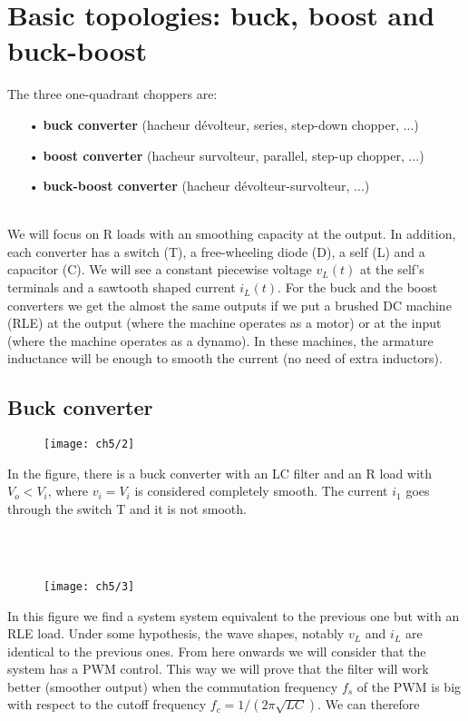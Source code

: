 \section{Basic topologies: buck, boost and buck-boost}
	The three one-quadrant choppers are:
	\begin{itemize}
		\item[•] \textbf{buck converter} (hacheur dévolteur, series, step-down chopper, ...) 
		\item[•] \textbf{boost converter} (hacheur survolteur, parallel, step-up chopper, ...)
		\item[•] \textbf{buck-boost converter} (hacheur dévolteur-survolteur, ...)
	\end{itemize}
	\ \\
	We will focus on R loads with an smoothing capacity at the output. In addition, each converter has a switch (T), a free-wheeling diode (D), a self (L) and a capacitor (C). We will see a constant piecewise voltage $v_L(t)$ at the self's terminals and a sawtooth shaped current $i_L(t)$. For the buck and the boost converters we get the almost the same outputs if we put a brushed DC machine (RLE) at the output (where the machine operates as a motor) or at the input (where the machine operates as a dynamo). In these machines, the armature inductance will be enough to smooth the current (no need of extra inductors). 
	
	\subsection{Buck converter}	
	
		\begin{wrapfigure}[6]{l}{5.5cm}
		\vspace{-5mm}
		\texttt{[image: ch5/2]}
		\end{wrapfigure}
		In the figure, there is a buck converter with an LC filter and an R load with $V_o < V_i$, where $v_i= V_i$ is considered completely smooth. The current $i_1$ goes through the switch T and it is not smooth.  
		
		\ \\\\
		 		
		\begin{wrapfigure}[6]{r}{4.5cm}
		\vspace{-5mm}
		\texttt{[image: ch5/3]}
		\end{wrapfigure}	
		In this figure we find a system system equivalent to the previous one but with an RLE load. Under some hypothesis, the wave shapes, notably $v_L$ and $i_L$ are identical to the previous ones. From here onwards we will consider that the system has a PWM control. This way we will prove that the filter will work better (smoother output) when the commutation frequency $f_s$ of the PWM is big with respect to the cutoff frequency $f_c = 1/(2\pi\sqrt{LC})$. We can therefore 
		
